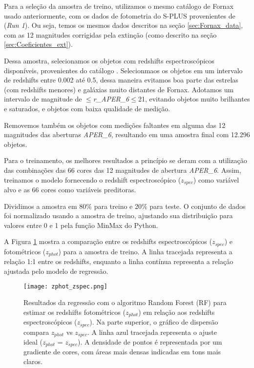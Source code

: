 Para a seleção da amostra de treino, utilizamos o mesmo catálogo de Fornax usado anteriormente, com os dados de fotometria do S-PLUS provenientes de \cite{haack2024splusfornaxprojectsfp} (\textit{Run 1}). Ou seja, temos os mesmos dados descritos na seção \ref{sec:Fornax_data}, com as 12 magnitudes corrigidas pela extinção (como descrito na seção \ref{sec:Coeficientes_ext}).

Dessa amostra, selecionamos os objetos com redshifts espectroscópicos disponíveis, provenientes do catálogo \cite{Lima_2024}. Selecionmaos os objetos em um intervalo de redshifts entre 0.002 até 0.5, dessa maneira evitamos boa parte das estrelas (com redshifts menores) e galáxias muito distantes de Fornax. Adotamos um intervalo de magnitude de $\leq$\textit{r\_APER\_6}$\leq$21, evitando objetos muito brilhantes e saturados, e objetos com baixa qualidade de medição.

Removemos também os objetos com medições faltantes em alguma das 12 magnitudes das aberturas \textit{APER\_6}, resultando em uma amostra final com 12.296 objetos.

Para o treinamento, os melhores resultados a princípio se deram com a utilização das combinações das 66 cores das 12 magnitudes de abertura \textit{APER\_6}. Assim, treinamos o modelo fornecendo o redshift espectroscópico (\textit{$z_{spec}$}) como variável alvo e as 66 cores como variáveis preditoras.

Dividimos a amostra em 80\% para treino e 20\% para teste. O conjunto de dados foi normalizado usando a amostra de treino, ajustando sua distribuição para valores entre 0 e 1 pela função MinMax do Python. 

A Figura \ref{zphot_zspec} mostra a comparação entre os redshifts espectroscópicos (\textit{$z_{spec}$}) e fotométricos (\textit{$z_{phot}$}) para a amostra de treino. A linha tracejada representa a relação 1:1 entre os redshifts, enquanto a linha contínua representa a relação ajustada pelo modelo de regressão.

\begin{figure}[!ht]
    \centering
    \texttt{[image: zphot\_zspec.png]}
    \caption[]{Resultados da regressão com o algoritmo Random Forest (RF) para estimar os redshifts fotométricos (\textit{$z_{phot}$}) em relação aos redshifts espectroscópicos (\textit{$z_{spec}$}). Na parte superior, o gráfico de dispersão compara \textit{$z_{phot}$} vs \textit{$z_{spec}$}. A linha azul tracejada representa o ajuste ideal (\textit{$z_{phot}$} = \textit{$z_{spec}$}). A densidade de pontos é representada por um gradiente de cores, com áreas mais densas indicadas em tons mais claros.}
    \label{zphot_zspec}
\end{figure}

